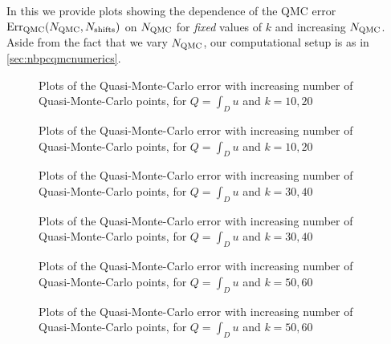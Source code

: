 In this  we provide plots showing the dependence of the QMC error $\QMCerror{\NQMC}{\Nshifts}$ on $N_{\mathrm{QMC}}$ for \emph{fixed} values of $k$ and increasing $N_{\mathrm{QMC}}$. Aside from the fact that we vary $N_{\mathrm{QMC}}$, our computational setup is as in \cref{sec:nbpcqmcnumerics}.

\begin{figure}[h]
    \centering
    
    \caption{Plots of the Quasi-Monte-Carlo error with increasing number of Quasi-Monte-Carlo points, for $Q=\int_D u$ and $k=10,20$ \label{fig:qmcintegral10}}
  \end{figure}
\begin{figure}[h]
  \centering

\caption{Plots of the Quasi-Monte-Carlo error with increasing number of Quasi-Monte-Carlo points, for $Q=\int_D u$ and $k=10,20$ \label{fig:qmcintegral20}}
\end{figure}
\begin{figure}[h]
    \centering
    
    \caption{Plots of the Quasi-Monte-Carlo error with increasing number of Quasi-Monte-Carlo points, for $Q=\int_D u$ and $k=30,40$ \label{fig:qmcintegral30}}
\end{figure}
\begin{figure}[h]
  \centering

\caption{Plots of the Quasi-Monte-Carlo error with increasing number of Quasi-Monte-Carlo points, for $Q=\int_D u$ and $k=30,40$ \label{fig:qmcintegral40}}
\end{figure}
\begin{figure}[h]
    \centering
    
    \caption{Plots of the Quasi-Monte-Carlo error with increasing number of Quasi-Monte-Carlo points, for $Q=\int_D u$ and $k=50,60$ \label{fig:qmcintegral50}}
  \end{figure}
\begin{figure}[h]
  \centering

\caption{Plots of the Quasi-Monte-Carlo error with increasing number of Quasi-Monte-Carlo points, for $Q=\int_D u$ and $k=50,60$ \label{fig:qmcintegral60}}
\end{figure}


